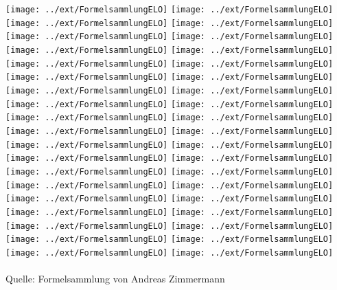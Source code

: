 \texttt{[image: ../ext/FormelsammlungELO]}\newpage
\texttt{[image: ../ext/FormelsammlungELO]}\newpage
\texttt{[image: ../ext/FormelsammlungELO]}\newpage
\texttt{[image: ../ext/FormelsammlungELO]}\newpage
\texttt{[image: ../ext/FormelsammlungELO]}\newpage
\texttt{[image: ../ext/FormelsammlungELO]}\newpage
\texttt{[image: ../ext/FormelsammlungELO]}\newpage
\texttt{[image: ../ext/FormelsammlungELO]}\newpage
\texttt{[image: ../ext/FormelsammlungELO]}\newpage
\texttt{[image: ../ext/FormelsammlungELO]}\newpage
\texttt{[image: ../ext/FormelsammlungELO]}\newpage
\texttt{[image: ../ext/FormelsammlungELO]}\newpage
\texttt{[image: ../ext/FormelsammlungELO]}\newpage
\texttt{[image: ../ext/FormelsammlungELO]}\newpage
\texttt{[image: ../ext/FormelsammlungELO]}\newpage
\texttt{[image: ../ext/FormelsammlungELO]}\newpage
\texttt{[image: ../ext/FormelsammlungELO]}\newpage
\texttt{[image: ../ext/FormelsammlungELO]}\newpage
\texttt{[image: ../ext/FormelsammlungELO]}\newpage
\texttt{[image: ../ext/FormelsammlungELO]}\newpage
\texttt{[image: ../ext/FormelsammlungELO]}\newpage
\texttt{[image: ../ext/FormelsammlungELO]}\newpage
\texttt{[image: ../ext/FormelsammlungELO]}\newpage
\texttt{[image: ../ext/FormelsammlungELO]}\newpage
\texttt{[image: ../ext/FormelsammlungELO]}\newpage
\texttt{[image: ../ext/FormelsammlungELO]}\newpage
\texttt{[image: ../ext/FormelsammlungELO]}\newpage
\texttt{[image: ../ext/FormelsammlungELO]}\newpage
\texttt{[image: ../ext/FormelsammlungELO]}\newpage
\texttt{[image: ../ext/FormelsammlungELO]}\newpage
\texttt{[image: ../ext/FormelsammlungELO]}\newpage
\texttt{[image: ../ext/FormelsammlungELO]}\newpage
\texttt{[image: ../ext/FormelsammlungELO]}\newpage
\texttt{[image: ../ext/FormelsammlungELO]}\newpage
\texttt{[image: ../ext/FormelsammlungELO]}\newpage
\texttt{[image: ../ext/FormelsammlungELO]}\newpage
\texttt{[image: ../ext/FormelsammlungELO]}\newpage
\texttt{[image: ../ext/FormelsammlungELO]}
\\
\\
Quelle: Formelsammlung von Andreas Zimmermann